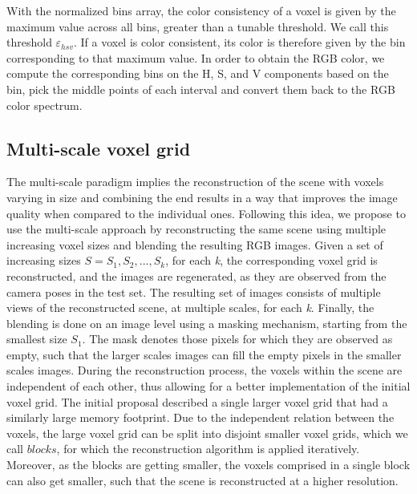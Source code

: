 \documentclass{article}
\begin{document}
With the normalized bins array, the color consistency of a voxel is given by the maximum value across all bins, greater than a tunable threshold. We call this threshold \(\varepsilon_{hsv}\). If a voxel is color consistent, its color is therefore given by the bin corresponding to that maximum value. In order to obtain the RGB color, we compute the corresponding bins on the H, S, and V components based on the bin, pick the middle points of each interval and convert them back to the RGB color spectrum.

\subsection{Multi-scale voxel grid}\label{sec:vg}

The multi-scale paradigm implies the reconstruction of the scene with voxels varying in size and combining the end results in a way that improves the image quality when compared to the individual ones. Following this idea, we propose to use the multi-scale approach by reconstructing the same scene using multiple increasing voxel sizes and blending the resulting RGB images. Given a set of increasing sizes \(S = S_1, S_2, ..., S_k\), for each \textit{k}, the corresponding voxel grid is reconstructed, and the images are regenerated, as they are observed from the camera poses in the test set. The resulting set of images consists of multiple views of the reconstructed scene, at multiple scales, for each \textit{k}. Finally, the blending is done on an image level using a masking mechanism, starting from the smallest size \(S_1\). The mask denotes those pixels for which they are observed as empty, such that the larger scales images can fill the empty pixels in the smaller scales images. During the reconstruction process, the voxels within the scene are independent of each other, thus allowing for a better implementation of the initial voxel grid. The initial proposal described a single larger voxel grid that had a similarly large memory footprint. Due to the independent relation between the voxels, the large voxel grid can be split into disjoint smaller voxel grids, which we call \(blocks\), for which the reconstruction algorithm is applied iteratively. Moreover, as the blocks are getting smaller, the voxels comprised in a single block can also get smaller, such that the scene is reconstructed at a higher resolution.


\end{document}
